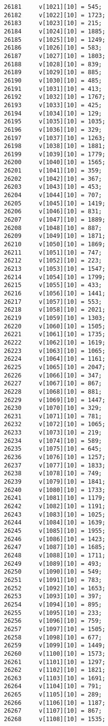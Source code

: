\begin{Code}
\begin{verbatim}
26181     v[1021][10] = 545;
26182     v[1022][10] = 1723;
26183     v[1023][10] = 215;
26184     v[1024][10] = 1885;
26185     v[1025][10] = 1249;
26186     v[1026][10] = 583;
26187     v[1027][10] = 1803;
26188     v[1028][10] = 839;
26189     v[1029][10] = 885;
26190     v[1030][10] = 485;
26191     v[1031][10] = 413;
26192     v[1032][10] = 1767;
26193     v[1033][10] = 425;
26194     v[1034][10] = 129;
26195     v[1035][10] = 1035;
26196     v[1036][10] = 329;
26197     v[1037][10] = 1263;
26198     v[1038][10] = 1881;
26199     v[1039][10] = 1779;
26200     v[1040][10] = 1565;
26201     v[1041][10] = 359;
26202     v[1042][10] = 367;
26203     v[1043][10] = 453;
26204     v[1044][10] = 707;
26205     v[1045][10] = 1419;
26206     v[1046][10] = 831;
26207     v[1047][10] = 1889;
26208     v[1048][10] = 887;
26209     v[1049][10] = 1871;
26210     v[1050][10] = 1869;
26211     v[1051][10] = 747;
26212     v[1052][10] = 223;
26213     v[1053][10] = 1547;
26214     v[1054][10] = 1799;
26215     v[1055][10] = 433;
26216     v[1056][10] = 1441;
26217     v[1057][10] = 553;
26218     v[1058][10] = 2021;
26219     v[1059][10] = 1303;
26220     v[1060][10] = 1505;
26221     v[1061][10] = 1735;
26222     v[1062][10] = 1619;
26223     v[1063][10] = 1065;
26224     v[1064][10] = 1161;
26225     v[1065][10] = 2047;
26226     v[1066][10] = 347;
26227     v[1067][10] = 867;
26228     v[1068][10] = 881;
26229     v[1069][10] = 1447;
26230     v[1070][10] = 329;
26231     v[1071][10] = 781;
26232     v[1072][10] = 1065;
26233     v[1073][10] = 219;
26234     v[1074][10] = 589;
26235     v[1075][10] = 645;
26236     v[1076][10] = 1257;
26237     v[1077][10] = 1833;
26238     v[1078][10] = 749;
26239     v[1079][10] = 1841;
26240     v[1080][10] = 1733;
26241     v[1081][10] = 1179;
26242     v[1082][10] = 1191;
26243     v[1083][10] = 1025;
26244     v[1084][10] = 1639;
26245     v[1085][10] = 1955;
26246     v[1086][10] = 1423;
26247     v[1087][10] = 1685;
26248     v[1088][10] = 1711;
26249     v[1089][10] = 493;
26250     v[1090][10] = 549;
26251     v[1091][10] = 783;
26252     v[1092][10] = 1653;
26253     v[1093][10] = 397;
26254     v[1094][10] = 895;
26255     v[1095][10] = 233;
26256     v[1096][10] = 759;
26257     v[1097][10] = 1505;
26258     v[1098][10] = 677;
26259     v[1099][10] = 1449;
26260     v[1100][10] = 1573;
26261     v[1101][10] = 1297;
26262     v[1102][10] = 1821;
26263     v[1103][10] = 1691;
26264     v[1104][10] = 791;
26265     v[1105][10] = 289;
26266     v[1106][10] = 1187;
26267     v[1107][10] = 867;
26268     v[1108][10] = 1535;

\end{verbatim}
\end{Code}
